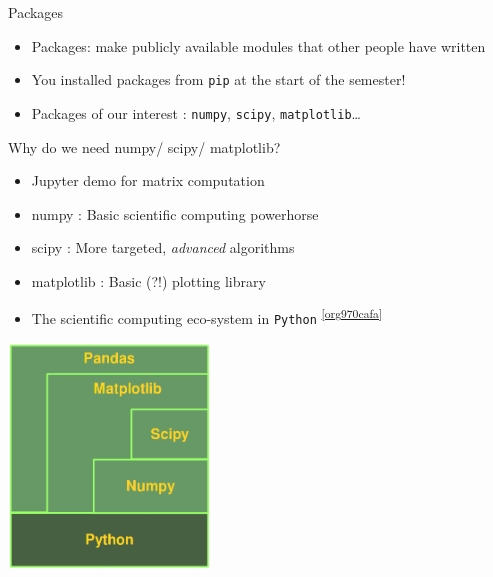 \documentclass[presentation]{beamer}
\begin{document}
\begin{frame}[label={sec:org0e3aea6},fragile]{Packages}
 \begin{itemize}
\item Packages: make publicly available modules that other people have written
\item You installed packages from \texttt{pip} at the start of the semester!
\item Packages of our interest : \texttt{numpy}, \texttt{scipy}, \texttt{matplotlib}\ldots{}
\end{itemize}
\end{frame}
\begin{frame}[label={sec:org7ee2248},fragile]{Why do we need numpy/ scipy/ matplotlib?}
 \begin{itemize}
\item \alert{Jupyter demo} for matrix computation
\item \alert{numpy} : Basic scientific computing powerhorse
\item \alert{scipy} : More targeted, \emph{advanced} algorithms
\item \alert{matplotlib} : Basic (?!) plotting library
\item The scientific computing eco-system in \texttt{Python} \textsuperscript{\cref{org970cafa}}
\end{itemize}
\begin{center}
\includegraphics[width=0.4\textwidth]{images/python_numerics.png}
\end{center}
\end{frame}

\end{document}
